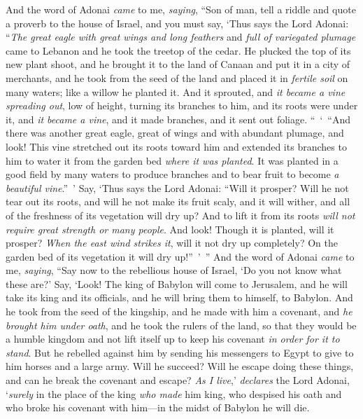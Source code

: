 \begin{biblechapter} %
 And the word of Adonai \textit{came} to me, \textit{saying},
\verse “Son of man, tell a riddle and quote a proverb to the house of Israel,
\verse and you must say, ‘Thus says the Lord Adonai: “\textit{The great eagle with great wings and long feathers} and \textit{full of variegated plumage} came to Lebanon and he took the treetop of the cedar.
\verse He plucked the top of its new plant shoot, and he brought it to the land of Canaan and put it in a city of merchants,
\verse and he took from the seed of the land and placed it in \textit{fertile soil} on many waters; like a willow he planted it.
\verse And it sprouted, and \textit{it became a vine spreading out}, low of height, turning its branches to him, and its roots were under it, and \textit{it became a vine}, and it made branches, and it sent out foliage.
\verse “ ‘ “And there was another great eagle, great of wings and with abundant plumage, and look! This vine stretched out its roots toward him and extended its branches to him to water it from the garden bed \textit{where it was planted}.
\verse It was planted in a good field by many waters to produce branches and to bear fruit to become \textit{a beautiful vine}.” ’
\verse Say, ‘Thus says the Lord Adonai: “Will it prosper? Will he not tear out its roots, and will he not make its fruit scaly, and it will wither, and all of the freshness of its vegetation will dry up? And to lift it from its roots \textit{will not require great strength or many people}.
\verse And look! Though it is planted, will it prosper? \textit{When the east wind strikes it}, will it not dry up completely? On the garden bed of its vegetation it will dry up!” ’ ”
\verse And the word of Adonai \textit{came} to me, \textit{saying},
\verse “Say now to the rebellious house of Israel, ‘Do you not know what these are?’ Say, ‘Look! The king of Babylon will come to Jerusalem, and he will take its king and its officials, and he will bring them to himself, to Babylon.
\verse And he took from the seed of the kingship, and he made with him a covenant, and \textit{he brought him under oath}, and he took the rulers of the land,
\verse so that they would be a humble kingdom and not lift itself up to keep his covenant \textit{in order for it to stand}.
\verse But he rebelled against him by sending his messengers to Egypt to give to him horses and a large army. Will he succeed? Will he escape doing these things, and can he break the covenant and escape?
\verse \textit{As I live},’ \textit{declares} the Lord Adonai, ‘\textit{surely} in the place of the king \textit{who made} him king, who despised his oath and who broke his covenant with him—in the midst of Babylon he will die.

\end{biblechapter}
